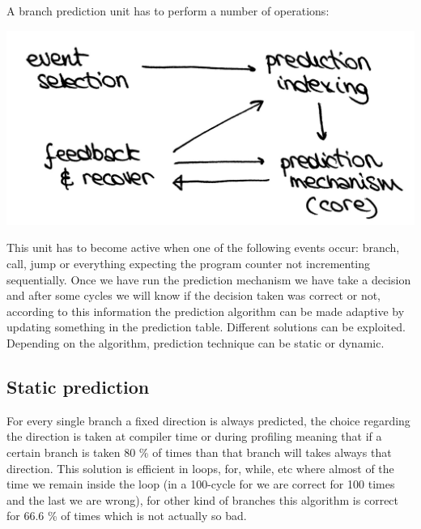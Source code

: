 A branch prediction unit has to perform a number of operations:

\begin{center}
  \includegraphics[width=0.55\linewidth]{img/img3/12}
\end{center}

This unit has to become active when one of the following events occur: branch,
call, jump or everything expecting the program counter not incrementing
sequentially.
Once we have run the prediction mechanism we have take a decision and after
some cycles we will know if the decision taken was correct or not, according to
this information the prediction algorithm can be made adaptive by updating
something in the prediction table. Different solutions can be exploited.
Depending on the algorithm, prediction technique can be static or dynamic.


\subsection{Static prediction}

For every single branch a fixed direction is always predicted, the choice
regarding the direction is taken at compiler time or during profiling meaning
that if a certain branch is taken 80 \% of times than that branch will takes
always that direction. This solution is efficient in loops, for, while, etc
where almost of the time we remain inside the loop (in a 100-cycle for we are
correct for 100 times and the last we are wrong), for other kind of branches
this algorithm is correct for 66.6 \% of times which is not actually so bad.



